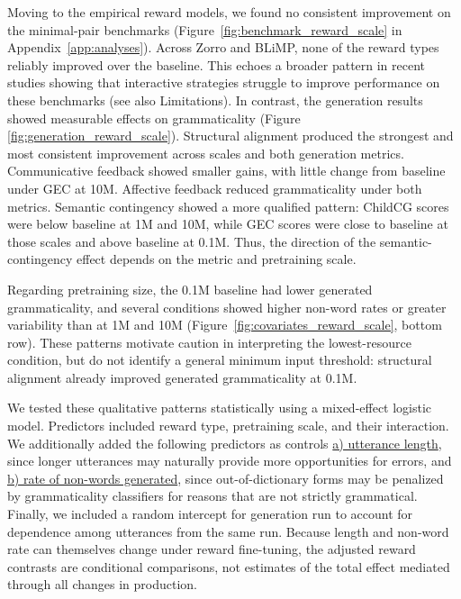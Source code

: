 Moving to the empirical reward models, we found no consistent improvement on the minimal-pair benchmarks (Figure~\ref{fig:benchmark_reward_scale} in Appendix~\ref{app:analyses}). Across Zorro and BLiMP, none of the reward types reliably improved over the baseline. This echoes a broader pattern in recent studies showing
that interactive strategies  struggle to improve performance on these benchmarks (see also Limitations). In contrast, the generation results showed measurable effects on grammaticality (Figure \ref{fig:generation_reward_scale}). Structural alignment produced the strongest and most consistent improvement across scales and both generation metrics. Communicative feedback showed smaller gains, with little change from baseline under GEC at 10M. Affective feedback reduced grammaticality under both metrics. Semantic contingency showed a more qualified pattern: ChildCG scores were below baseline at 1M and 10M, while GEC scores were close to baseline at those scales and above baseline at 0.1M. Thus, the direction of the semantic-contingency effect depends on the metric and pretraining scale.

Regarding pretraining size, the 0.1M baseline had lower generated grammaticality, and several conditions showed higher non-word rates or greater variability than at 1M and 10M (Figure~\ref{fig:covariates_reward_scale}, bottom row). These patterns motivate caution in interpreting the lowest-resource condition, but do not identify a general minimum input threshold: structural alignment already improved generated grammaticality at 0.1M.

We tested these qualitative patterns statistically using a mixed-effect logistic model. Predictors included reward type, pretraining scale, and their interaction. We additionally added the following predictors as controls \uline{a) utterance length}, since longer utterances may naturally provide more opportunities for errors, and \uline{b) rate of non-words generated}, since out-of-dictionary forms may be penalized by grammaticality classifiers for reasons that are not strictly grammatical.  Finally, we included a random intercept for generation run to account for dependence among utterances from the same run. Because length and non-word rate can themselves change under reward fine-tuning, the adjusted reward contrasts are conditional comparisons, not estimates of the total effect mediated through all changes in production.


